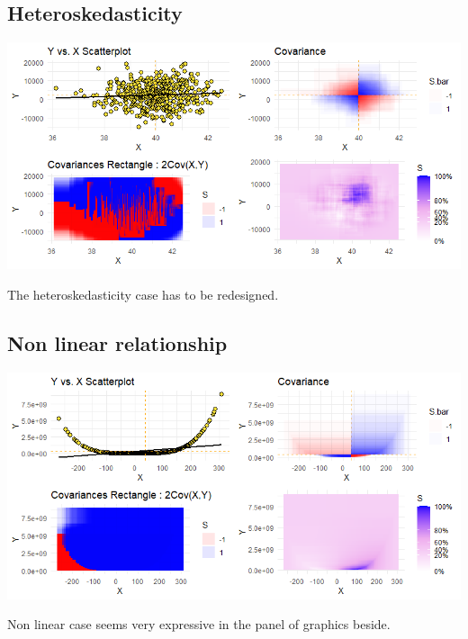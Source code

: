 \documentclass[
]{report}
\begin{document}
\hypertarget{heteroskedasticity}{%
\subsection{Heteroskedasticity}\label{heteroskedasticity}}

\vspace{0.6cm}

\begin{minipage}{0.70\textwidth}
    \includegraphics{plotnetrec_heteroscedasticite.png}
\end{minipage}
\hspace{3.5ex}
\begin{minipage}{0.25\textwidth}
  The heteroskedasticity case has to be redesigned.
\end{minipage}

\hypertarget{non-linear-relationship}{%
\subsection{Non linear relationship}\label{non-linear-relationship}}

\vspace{0.6cm}

\begin{minipage}{0.70\textwidth}
    \includegraphics{plotetrect_non_linear.png}
\end{minipage}
\hspace{3.5ex}
\begin{minipage}{0.25\textwidth}
    Non linear case seems very expressive in the panel of graphics beside.
\end{minipage}
\end{document}
